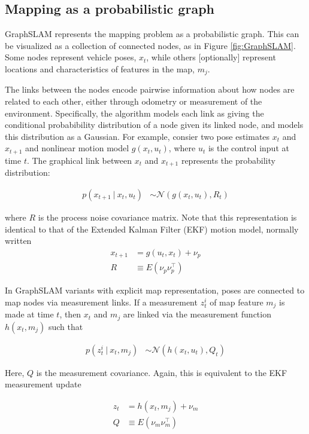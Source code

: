 \subsection{Mapping as a probabilistic graph}

GraphSLAM represents the mapping problem as a probabilistic graph. This can be visualized as a collection of connected nodes, as in Figure \ref{fig:GraphSLAM}. Some nodes represent vehicle poses, $x_t$, while others [optionally] represent locations and characteristics of features in the map, $m_j$. 

The links between the nodes encode pairwise information about how nodes are related to each other, either through odometry or measurement of the environment. Specifically, the algorithm models each link as giving the conditional probabibility distribution of a node given its linked node, and models this distribution as a Gaussian. For example, consier two pose estimates $x_t$ and  $x_{t+1}$ and nonlinear motion model $g(x_t,u_t)$, where $u_t$ is the control input at time $t$. The graphical link between $x_t$ and  $x_{t+1}$ represents the probability distribution: 

\begin{align}
p\left(x_{t+1}~|~x_t,u_t\right) & \sim \mathcal{N}\left(g(x_t,u_t), R_t\right)
\label {eq:Gauss1}
\end{align}

where $R$ is the process noise covariance matrix. Note that this representation is identical to that of the Extended Kalman Filter (EKF) motion model, normally written 
\begin{align}
x_{t+1} &= g\left(u_t,x_t\right) + \nu_p\\
R &\equiv E\left(\nu_p \nu_p^\intercal\right) 
\end{align}

In GraphSLAM variants with explicit map representation, poses are connected to map nodes via measurement links. If a measurement $z^i_t$ of map feature $m_j$ is made at time $t$, then $x_t$ and $m_j$ are linked via the measurement function $h \left(x_t,m_j\right)$ such that 

\begin{align}
p\left(z^i_{t}~|~x_t,m_j\right) & \sim \mathcal{N}\left(h(x_t,u_t), Q_t\right)
\label {eq:Gauss2}
\end{align}

Here, $Q$ is the measurement covariance. Again, this is equivalent to the EKF measurement update

\begin{align}
z_{t} &= h\left(x_t,m_j\right) + \nu_m\\
Q &\equiv E\left(\nu_m \nu_m^\intercal\right) 
\end{align}

